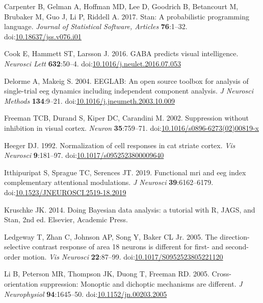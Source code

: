 \documentclass[]{article}
\begin{document}
\leavevmode\hypertarget{ref-Carpenter2017}{}%
Carpenter B, Gelman A, Hoffman MD, Lee D, Goodrich B, Betancourt M, Brubaker M, Guo J, Li P, Riddell A. 2017. Stan: A probabilistic programming language. \emph{Journal of Statistical Software, Articles} \textbf{76}:1--32. doi:\href{https://doi.org/10.18637/jss.v076.i01}{10.18637/jss.v076.i01}

\leavevmode\hypertarget{ref-Cook2016}{}%
Cook E, Hammett ST, Larsson J. 2016. GABA predicts visual intelligence. \emph{Neurosci Lett} \textbf{632}:50--4. doi:\href{https://doi.org/10.1016/j.neulet.2016.07.053}{10.1016/j.neulet.2016.07.053}

\leavevmode\hypertarget{ref-Delorme2004}{}%
Delorme A, Makeig S. 2004. EEGLAB: An open source toolbox for analysis of single-trial eeg dynamics including independent component analysis. \emph{J Neurosci Methods} \textbf{134}:9--21. doi:\href{https://doi.org/10.1016/j.jneumeth.2003.10.009}{10.1016/j.jneumeth.2003.10.009}

\leavevmode\hypertarget{ref-Freeman2002}{}%
Freeman TCB, Durand S, Kiper DC, Carandini M. 2002. Suppression without inhibition in visual cortex. \emph{Neuron} \textbf{35}:759--71. doi:\href{https://doi.org/10.1016/s0896-6273(02)00819-x}{10.1016/s0896-6273(02)00819-x}

\leavevmode\hypertarget{ref-Heeger1992}{}%
Heeger DJ. 1992. Normalization of cell responses in cat striate cortex. \emph{Vis Neurosci} \textbf{9}:181--97. doi:\href{https://doi.org/10.1017/s0952523800009640}{10.1017/s0952523800009640}

\leavevmode\hypertarget{ref-Itthipuripat2019}{}%
Itthipuripat S, Sprague TC, Serences JT. 2019. Functional mri and eeg index complementary attentional modulations. \emph{J Neurosci} \textbf{39}:6162--6179. doi:\href{https://doi.org/10.1523/JNEUROSCI.2519-18.2019}{10.1523/JNEUROSCI.2519-18.2019}

\leavevmode\hypertarget{ref-Kruschke2014}{}%
Kruschke JK. 2014. Doing Bayesian data analysis: a tutorial with R, JAGS, and Stan, 2nd ed. Elsevier, Academic Press.

\leavevmode\hypertarget{ref-Ledgeway2005}{}%
Ledgeway T, Zhan C, Johnson AP, Song Y, Baker CL Jr. 2005. The direction-selective contrast response of area 18 neurons is different for first- and second-order motion. \emph{Vis Neurosci} \textbf{22}:87--99. doi:\href{https://doi.org/10.1017/S0952523805221120}{10.1017/S0952523805221120}

\leavevmode\hypertarget{ref-Li2005}{}%
Li B, Peterson MR, Thompson JK, Duong T, Freeman RD. 2005. Cross-orientation suppression: Monoptic and dichoptic mechanisms are different. \emph{J Neurophysiol} \textbf{94}:1645--50. doi:\href{https://doi.org/10.1152/jn.00203.2005}{10.1152/jn.00203.2005}
\end{document}
